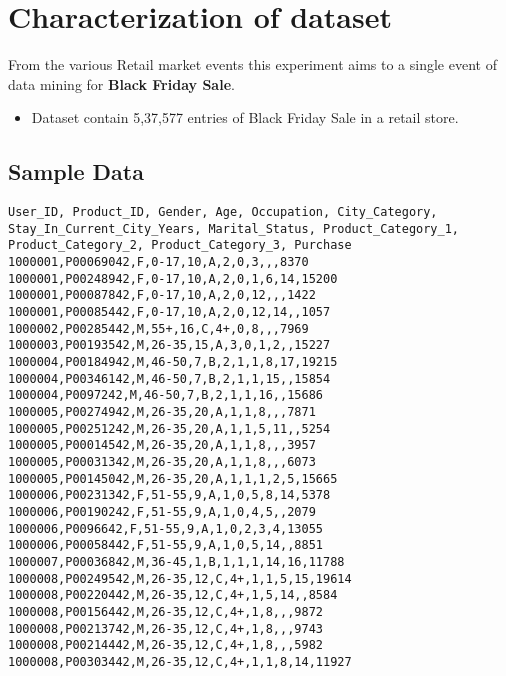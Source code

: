 \documentclass[paper=letter, fontsize=12pt]{article}
\begin{document}
\section{Characterization of dataset}
From the various Retail market events this experiment aims to a single event of data mining for \textbf{Black Friday Sale}.

\begin{itemize}
	\item Dataset contain 5,37,577 entries of Black Friday Sale in a retail store.
\end{itemize}
\subsection{Sample Data}
\begin{verbatim}
User_ID, Product_ID, Gender, Age, Occupation, City_Category, Stay_In_Current_City_Years, Marital_Status, Product_Category_1, Product_Category_2, Product_Category_3, Purchase
1000001,P00069042,F,0-17,10,A,2,0,3,,,8370
1000001,P00248942,F,0-17,10,A,2,0,1,6,14,15200
1000001,P00087842,F,0-17,10,A,2,0,12,,,1422
1000001,P00085442,F,0-17,10,A,2,0,12,14,,1057
1000002,P00285442,M,55+,16,C,4+,0,8,,,7969
1000003,P00193542,M,26-35,15,A,3,0,1,2,,15227
1000004,P00184942,M,46-50,7,B,2,1,1,8,17,19215
1000004,P00346142,M,46-50,7,B,2,1,1,15,,15854
1000004,P0097242,M,46-50,7,B,2,1,1,16,,15686
1000005,P00274942,M,26-35,20,A,1,1,8,,,7871
1000005,P00251242,M,26-35,20,A,1,1,5,11,,5254
1000005,P00014542,M,26-35,20,A,1,1,8,,,3957
1000005,P00031342,M,26-35,20,A,1,1,8,,,6073
1000005,P00145042,M,26-35,20,A,1,1,1,2,5,15665
1000006,P00231342,F,51-55,9,A,1,0,5,8,14,5378
1000006,P00190242,F,51-55,9,A,1,0,4,5,,2079
1000006,P0096642,F,51-55,9,A,1,0,2,3,4,13055
1000006,P00058442,F,51-55,9,A,1,0,5,14,,8851
1000007,P00036842,M,36-45,1,B,1,1,1,14,16,11788
1000008,P00249542,M,26-35,12,C,4+,1,1,5,15,19614
1000008,P00220442,M,26-35,12,C,4+,1,5,14,,8584
1000008,P00156442,M,26-35,12,C,4+,1,8,,,9872
1000008,P00213742,M,26-35,12,C,4+,1,8,,,9743
1000008,P00214442,M,26-35,12,C,4+,1,8,,,5982
1000008,P00303442,M,26-35,12,C,4+,1,1,8,14,11927
\end{verbatim}
\end{document}

